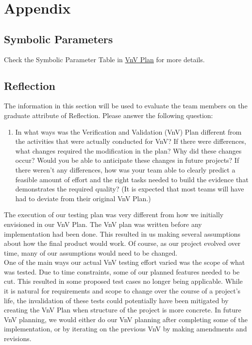 \documentclass[12pt, titlepage]{article}
\begin{document}



\newpage{}
\section*{Appendix}
\subsection{Symbolic Parameters}
Check the Symbolic Parameter Table in \href{https://github.com/beatlepie/4G06CapstoneProjectTeam2/blob/main/docs/VnVPlan/VnVPlan.pdf}{VnV Plan} for more details.

\subsection{Reflection}
The information in this section will be used to evaluate the team members on the
graduate attribute of Reflection.  Please answer the following question:

\begin{enumerate}
  \item In what ways was the Verification and Validation (VnV) Plan different
  from the activities that were actually conducted for VnV?  If there were
  differences, what changes required the modification in the plan?  Why did
  these changes occur?  Would you be able to anticipate these changes in future
  projects?  If there weren't any differences, how was your team able to clearly
  predict a feasible amount of effort and the right tasks needed to build the
  evidence that demonstrates the required quality?  (It is expected that most
  teams will have had to deviate from their original VnV Plan.)
\end{enumerate}

The execution of our testing plan was very different from how we initially envisioned in our VnV Plan. The VnV plan was written before any implementation had been done.
This resulted in us making several assumptions about how the final product would work. Of course, as our project evolved over time, many of our assumptions would need to be changed.\\

One of the main ways our actual VnV testing effort varied was the scope of what was tested. Due to time constraints, some of our planned features needed to be cut.
This resulted in some proposed test cases no longer being applicable. While it is natural for requirements and scope to change over the course of a project's life, the invalidation of these tests
could potentially have been mitigated by creating the VnV Plan when structure of the project is more concrete. In future VnV planning, we would either do our VnV planning after completing some of the
implementation, or by iterating on the previous VnV by making amendments and revisions.\\
\end{document}
